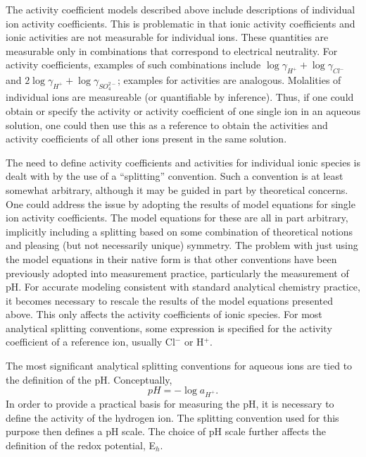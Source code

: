 The activity coefficient models described above include descriptions
of individual ion activity coefficients. This is problematic in that
ionic activity coefficients and ionic activities are not measurable
for individual ions. These quantities are measurable only in
combinations that correspond to electrical neutrality. For activity
coefficients, examples of such combinations include 
$\log \gamma_{H^{+} } +\log \gamma_{Cl^{-} }$ and 
$2\log \gamma_{H^{+} } +\log \gamma_{SO_{4}^{2-}}$; 
examples for activities are analogous.
Molalities of individual ions are measureable (or quantifiable by
inference). Thus, if one could obtain or specify the activity or
activity coefficient of one single ion in an aqueous solution, one
could then use this as a reference to obtain the activities and
activity coefficients of all other ions present in the same solution.

The need to define activity coefficients and activities for individual
ionic species is dealt with by the use of a ``splitting'' convention.
Such a convention is at least somewhat arbitrary, although it may be
guided in part by theoretical concerns. One could address the issue by
adopting the results of model equations for single ion activity
coefficients. The model equations for these are all in part arbitrary,
implicitly including a splitting based on some combination of
theoretical notions and pleasing (but not necessarily unique)
symmetry. The problem with just using the model equations in their
native form is that other conventions have been previously adopted
into measurement practice, particularly the measurement of pH. For
accurate modeling consistent with standard analytical chemistry
practice, it becomes necessary to rescale the results of the model
equations presented above. This only affects the activity coefficients
of ionic species. For most analytical splitting conventions, some
expression is specified for the activity coefficient of a reference
ion, usually Cl$^-$ or H$^+$.

The most significant analytical splitting conventions for aqueous ions
are tied to the definition of the pH. Conceptually,
%
\begin{equation}
   pH = -\log a_{H^{+}} .
\end{equation}
%
In order to provide a practical basis for measuring the pH, it is
necessary to define the activity of the hydrogen ion. The splitting
convention used for this purpose then defines a pH scale. The choice
of pH scale further affects the definition of the redox potential, E$_h$. %

